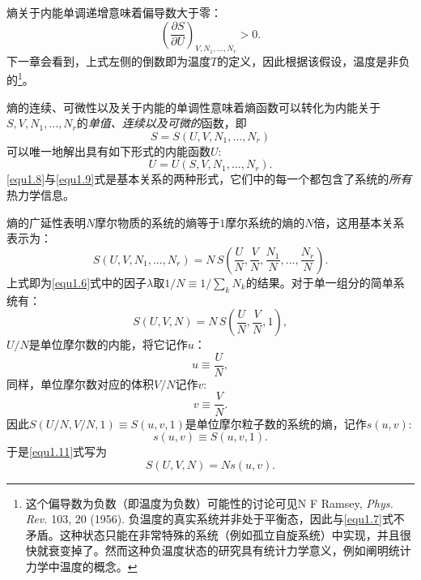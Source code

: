 熵关于内能单调递增意味着偏导数大于零：
\begin{equation}
\label{equ1.7}
	\left( \frac{\partial S}{\partial U} \right)_{V, N_1, \dots, N_r} > 0.
\end{equation}
下一章会看到，上式左侧的倒数即为温度$T$的定义，因此根据该假设，温度是非负的\footnote{这个偏导数为负数（即温度为负数）可能性的讨论可见N F Ramsey, {\it Phys. Rev.} 103, 20 (1956). 负温度的真实系统并非处于平衡态，因此与\eqref{equ1.7}式不矛盾。这种状态只能在非常特殊的系统（例如孤立自旋系统）中实现，并且很快就衰变掉了。然而这种负温度状态的研究具有统计力学意义，例如阐明统计力学中温度的概念。 }。

熵的连续、可微性以及关于内能的单调性意味着熵函数可以转化为内能关于$S, V, N_1, \dots, N_r$的{\it 单值、连续以及可微的}函数，即
\begin{equation}
\label{equ1.8}
	S = S(U, V, N_1, \dots, N_r)
\end{equation}
可以唯一地解出具有如下形式的内能函数$U$:
\begin{equation}
\label{equ1.9}
	U = U(S, V, N_1, \dots, N_r).
\end{equation}
\eqref{equ1.8}与\eqref{equ1.9}式是基本关系的两种形式，它们中的每一个都包含了系统的{\it 所有}热力学信息。

熵的广延性表明$N$摩尔物质的系统的熵等于$1$摩尔系统的熵的$N$倍，这用基本关系表示为：
\begin{equation}
\label{equ1.10}
	S(U, V, N_1, \dots, N_r) = N\, S \left( \frac{U}{N}, \frac{V}{N}, \frac{N_1}{N}, \dots, \frac{N_r}{N} \right).
\end{equation}
上式即为\eqref{equ1.6}式中的因子$\lambda$取$1/N \equiv 1 / \sum_k N_k$的结果。对于单一组分的简单系统有：
\begin{equation}
\label{equ1.11}
	S(U, V, N) = N\, S \left( \frac{U}{N}, \frac{V}{N}, 1 \right),
\end{equation}
$U/N$是单位摩尔数的内能，将它记作$u$：
\begin{equation}
\label{equ1.12}
	u \equiv \frac{U}{N},
\end{equation}
同样，单位摩尔数对应的体积$V/N$记作$v$:
\begin{equation}
\label{equ1.13}
	v \equiv \frac{V}{N}.
\end{equation}
因此$S(U/N, V/N, 1) \equiv S(u, v, 1)$是单位摩尔粒子数的系统的熵，记作$s(u, v)$:
\begin{equation}
\label{equ1.14}
	s(u, v) \equiv S(u, v, 1).
\end{equation}
于是\eqref{equ1.11}式写为
\begin{equation}
\label{equ1.15}
	S(U, V, N) = N s(u, v).
\end{equation}

